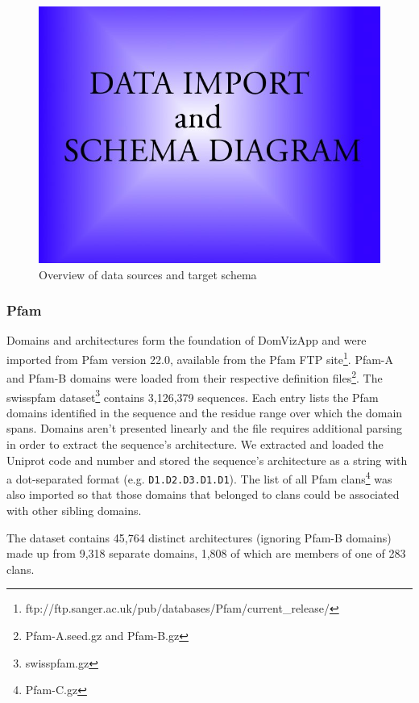 \begin{figure}[h]
 \begin{center}
 \includegraphics[scale=0.5]{figures/placeholder.jpg}
 \end{center}
 \caption{Overview of data sources and target schema}
 \label{dataimport}
\end{figure}

\subsubsection{Pfam}
Domains and architectures form the foundation of DomVizApp and were imported from Pfam version 22.0, available from the Pfam FTP site\footnote{ftp://ftp.sanger.ac.uk/pub/databases/Pfam/current\_release/}. Pfam-A and Pfam-B domains were loaded from their respective definition files\footnote{Pfam-A.seed.gz and Pfam-B.gz}. The swisspfam dataset\footnote{swisspfam.gz} contains 3,126,379 sequences. Each entry lists the Pfam domains identified in the sequence and the residue range over which the domain spans. Domains aren't presented linearly and the file requires additional parsing in order to extract the sequence's architecture. We extracted and loaded the Uniprot code and number and stored the sequence's architecture as a string with a dot-separated format (e.g. \texttt{D1.D2.D3.D1.D1}). The list of all Pfam clans\footnote{Pfam-C.gz} was also imported so that those domains that belonged to clans could be associated with other sibling domains. 

The dataset contains 45,764 distinct architectures (ignoring Pfam-B domains) made up from 9,318 separate domains, 1,808 of which are members of one of 283 clans.

